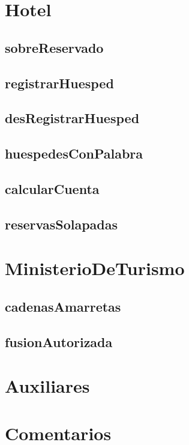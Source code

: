 \documentclass[a4paper]{article}
\begin{document}
\newpage

\section{Hotel}


\subsection{sobreReservado}


\subsection{registrarHuesped}


\subsection{desRegistrarHuesped}


\subsection{huespedesConPalabra}


\subsection{calcularCuenta}


\subsection{reservasSolapadas}


\newpage

\section{MinisterioDeTurismo}


\subsection{cadenasAmarretas}


\subsection{fusionAutorizada}


\newpage

\section{Auxiliares}


\newpage

\section{Comentarios}

\end{document}
